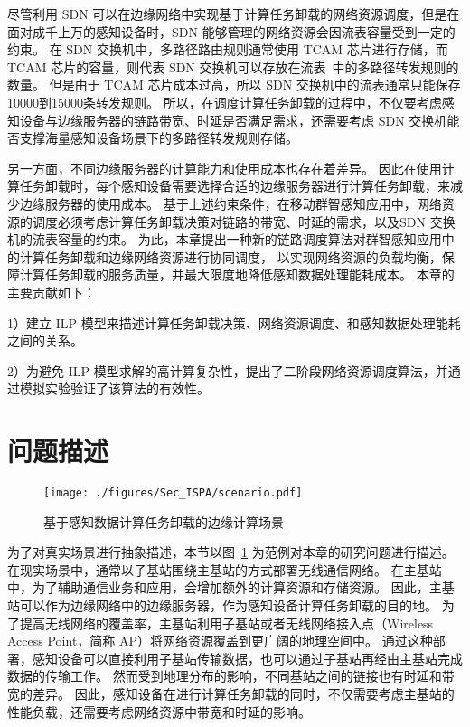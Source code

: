 尽管利用 SDN 可以在边缘网络中实现基于计算任务卸载的网络资源调度，但是在面对成千上万的感知设备时，SDN 能够管理的网络资源会因流表容量受到一定的约束。
在 SDN 交换机中，多路径路由规则通常使用 TCAM 芯片进行存储，而 TCAM 芯片的容量，则代表 SDN 交换机可以存放在流表~\cite{Dasgupta:2012:DMD:2400771.2401550}中的多路径转发规则的数量。
但是由于 TCAM 芯片成本过高，所以 SDN 交换机中的流表通常只能保存10000到15000条转发规则。
所以，在调度计算任务卸载的过程中，不仅要考虑感知设备与边缘服务器的链路带宽、时延是否满足需求，还需要考虑 SDN 交换机能否支撑海量感知设备场景下的多路径转发规则存储。

另一方面，不同边缘服务器的计算能力和使用成本也存在着差异。
因此在使用计算任务卸载时，每个感知设备需要选择合适的边缘服务器进行计算任务卸载，来减少边缘服务器的使用成本。
基于上述约束条件，在移动群智感知应用中，网络资源的调度必须考虑计算任务卸载决策对链路的带宽、时延的需求，以及SDN 交换机的流表容量的约束。
为此，本章提出一种新的链路调度算法对群智感知应用中的计算任务卸载和边缘网络资源进行协同调度，
以实现网络资源的负载均衡，保障计算任务卸载的服务质量，并最大限度地降低感知数据处理能耗成本。
本章的主要贡献如下：

1）建立 ILP 模型来描述计算任务卸载决策、网络资源调度、和感知数据处理能耗之间的关系。

2）为避免 ILP 模型求解的高计算复杂性，提出了二阶段网络资源调度算法，并通过模拟实验验证了该算法的有效性。

\section{问题描述}

\begin{figure}[!b]
  \centering
  \texttt{[image: ./figures/Sec\_ISPA/scenario.pdf]}
  \vspace{-1em}
  \caption{基于感知数据计算任务卸载的边缘计算场景}
  \label{fig_scenario}
\end{figure}

为了对真实场景进行抽象描述，本节以图~\ref{fig_scenario} 为范例对本章的研究问题进行描述。
在现实场景中，通常以子基站围绕主基站的方式部署无线通信网络。
在主基站中，为了辅助通信业务和应用，会增加额外的计算资源和存储资源。
因此，主基站可以作为边缘网络中的边缘服务器，作为感知设备计算任务卸载的目的地。
为了提高无线网络的覆盖率，主基站利用子基站或者无线网络接入点（Wireless Access Point，简称 AP）将网络资源覆盖到更广阔的地理空间中。
通过这种部署，感知设备可以直接利用子基站传输数据，也可以通过子基站再经由主基站完成数据的传输工作。
然而受到地理分布的影响，不同基站之间的链接也有时延和带宽的差异。
因此，感知设备在进行计算任务卸载的同时，不仅需要考虑主基站的性能负载，还需要考虑网络资源中带宽和时延的影响。

